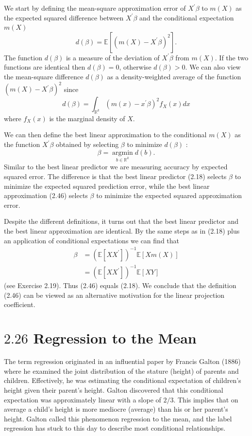 \documentclass[10pt]{article}
\begin{document}
We start by defining the mean-square approximation error of $X^{\prime} \beta$ to $m(X)$ as the expected squared difference between $X^{\prime} \beta$ and the conditional expectation $m(X)$
$$
d(\beta)=\mathbb{E}\left[\left(m(X)-X^{\prime} \beta\right)^{2}\right] .
$$
The function $d(\beta)$ is a measure of the deviation of $X^{\prime} \beta$ from $m(X)$. If the two functions are identical then $d(\beta)=0$, otherwise $d(\beta)>0$. We can also view the mean-square difference $d(\beta)$ as a density-weighted average of the function $\left(m(X)-X^{\prime} \beta\right)^{2}$ since
$$
d(\beta)=\int_{\mathbb{R}^{k}}\left(m(x)-x^{\prime} \beta\right)^{2} f_{X}(x) d x
$$
where $f_{X}(x)$ is the marginal density of $X$.

We can then define the best linear approximation to the conditional $m(X)$ as the function $X^{\prime} \beta$ obtained by selecting $\beta$ to minimize $d(\beta)$ :
$$
\beta=\underset{b \in \mathbb{R}^{k}}{\operatorname{argmin}} d(b) .
$$
Similar to the best linear predictor we are measuring accuracy by expected squared error. The difference is that the best linear predictor (2.18) selects $\beta$ to minimize the expected squared prediction error, while the best linear approximation (2.46) selects $\beta$ to minimize the expected squared approximation error.

Despite the different definitions, it turns out that the best linear predictor and the best linear approximation are identical. By the same steps as in (2.18) plus an application of conditional expectations we can find that
$$
\begin{aligned}
\beta &=\left(\mathbb{E}\left[X X^{\prime}\right]\right)^{-1} \mathbb{E}[X m(X)] \\
&=\left(\mathbb{E}\left[X X^{\prime}\right]\right)^{-1} \mathbb{E}[X Y]
\end{aligned}
$$
(see Exercise 2.19). Thus (2.46) equals (2.18). We conclude that the definition (2.46) can be viewed as an alternative motivation for the linear projection coefficient.

\section{$2.26$ Regression to the Mean}
The term regression originated in an influential paper by Francis Galton (1886) where he examined the joint distribution of the stature (height) of parents and children. Effectively, he was estimating the conditional expectation of children's height given their parent's height. Galton discovered that this conditional expectation was approximately linear with a slope of $2 / 3$. This implies that on average a child's height is more mediocre (average) than his or her parent's height. Galton called this phenomenon regression to the mean, and the label regression has stuck to this day to describe most conditional relationships.
\end{document}
